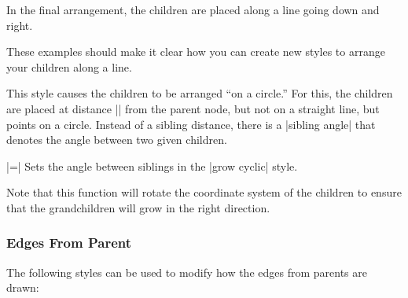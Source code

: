 \begin{itemize}
  In the final arrangement, the children are placed along a line going
  down and right.
\begin{codeexample}[]
\end{codeexample}

  These examples should make it clear how you can create new styles to
  arrange your children along a line.

  This style causes the children to be arranged ``on a circle.'' For
  this, the children are placed at distance |\tikzleveldistance| from
  the parent node, but not on a straight line, but points on a
  circle. Instead of a sibling distance, there is a |sibling angle|
  that denotes the angle between two given children.
  \begin{itemize}
    |=|
    Sets the angle between siblings in the |grow cyclic| style.
  \end{itemize}
  Note that this function will rotate the coordinate system of the
  children to ensure that the grandchildren will grow in the right
  direction.
\begin{codeexample}[]
\end{codeexample}
\end{itemize}

\subsubsection{Edges From Parent}

The following styles can be used to modify how the edges from parents
are drawn:

